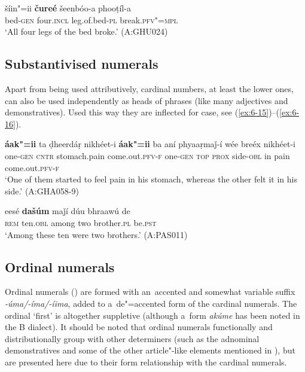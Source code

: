 \begin{exe}
\ex
\label{ex:6-14}
\gll šíin"=ii \textbf{čureé} šeenbóo-a phooṭíl-a \\
bed-\textsc{gen} four.\textsc{incl} leg.of.bed-\textsc{pl} break.\textsc{pfv"=mpl} \\
\glt `All four legs of the bed broke.' (A:GHU024)
\end{exe}

\subsection{Substantivised numerals}
\label{subsec:6-4-2}


Apart from being used attributively, cardinal numbers, at least the lower ones, can also be used independently as heads of  phrases (like many adjectives and demonstratives). Used this way they are inflected for case, see (\ref{ex:6-15})--(\ref{ex:6-16}).

\begin{exe}
\ex
\label{ex:6-15}
\gll \textbf{áak"=ii} ta ḍheerdáṛ nikhéet-i \textbf{áak"=ii} ba  aní phyaaṛmaǰ-í wée
breéx nikhéet-i \\
one-\textsc{gen} \textsc{cntr} stomach.pain come.out.\textsc{pfv-f} one-\textsc{gen} \textsc{top} \textsc{prox} side-\textsc{obl} in pain come.out.\textsc{pfv-f} \\
\glt `One of them started to feel pain in his stomach, whereas the other felt it in his side.'
(A:GHA058-9)

\ex
\label{ex:6-16}
\gll eesé \textbf{dašúm} maǰí dúu bhraawú de  \\
\textsc{rem} ten.\textsc{obl} among two brother.\textsc{pl} be.\textsc{pst}  \\
\glt `Among these ten were two brothers.' (A:PAS011)
\end{exe}

\subsection{Ordinal numerals}
\label{subsec:6-4-3}

Ordinal numerals () are formed with an~accented and somewhat variable suffix \textit{-úma/-íma/-íima}, added to a~de"=accented form of the cardinal numerals. The ordinal `first' is altogether suppletive (although a~form \textit{akúme} has been noted in the B dialect). It should be noted that ordinal numerals functionally and distributionally group with other determiners (such as the adnominal demonstratives and some of the other article"-like elements mentioned in ), but are presented here due to their form relationship with the cardinal numerals.



